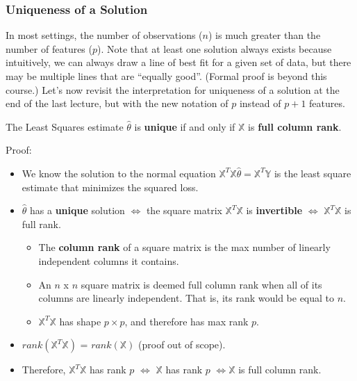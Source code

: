 \documentclass[
  letterpaper,
  DIV=11,
  numbers=noendperiod]{scrreprt}
\providecommand{\tightlist}{%
  \setlength{\itemsep}{0pt}\setlength{\parskip}{0pt}}\usepackage{longtable,booktabs,array}
\begin{document}
\subsubsection{Uniqueness of a Solution}\label{uniqueness-of-a-solution}

In most settings, the number of observations (\(n\)) is much greater
than the number of features (\(p\)). Note that at least one solution
always exists because intuitively, we can always draw a line of best fit
for a given set of data, but there may be multiple lines that are
``equally good''. (Formal proof is beyond this course.) Let's now
revisit the interpretation for uniqueness of a solution at the end of
the last lecture, but with the new notation of \(p\) instead of \(p+1\)
features.

The Least Squares estimate \(\hat{\theta}\) is \textbf{unique} if and
only if \(\mathbb{X}\) is \textbf{full column rank}.

\begin{tcolorbox}[enhanced jigsaw, leftrule=.75mm, breakable, colframe=quarto-callout-color-frame, colback=white, left=2mm, rightrule=.15mm, arc=.35mm, bottomrule=.15mm, opacityback=0, toprule=.15mm]

Proof:

\begin{itemize}
\tightlist
\item
  We know the solution to the normal equation
  \(\mathbb{X}^T\mathbb{X}\hat{\theta} = \mathbb{X}^T\mathbb{Y}\) is the
  least square estimate that minimizes the squared loss.
\item
  \(\hat{\theta}\) has a \textbf{unique} solution \(\iff\) the square
  matrix \(\mathbb{X}^T\mathbb{X}\) is \textbf{invertible} \(\iff\)
  \(\mathbb{X}^T\mathbb{X}\) is full rank.

  \begin{itemize}
  \tightlist
  \item
    The \textbf{column rank} of a square matrix is the max number of
    linearly independent columns it contains.
  \item
    An \(n\) x \(n\) square matrix is deemed full column rank when all
    of its columns are linearly independent. That is, its rank would be
    equal to \(n\).
  \item
    \(\mathbb{X}^T\mathbb{X}\) has shape \(p \times p\), and therefore
    has max rank \(p\).
  \end{itemize}
\item
  \(rank(\mathbb{X}^T\mathbb{X})\) = \(rank(\mathbb{X})\) (proof out of
  scope).
\item
  Therefore, \(\mathbb{X}^T\mathbb{X}\) has rank \(p\) \(\iff\)
  \(\mathbb{X}\) has rank \(p\) \(\iff \mathbb{X}\) is full column rank.
\end{itemize}

\end{tcolorbox}
\end{document}
